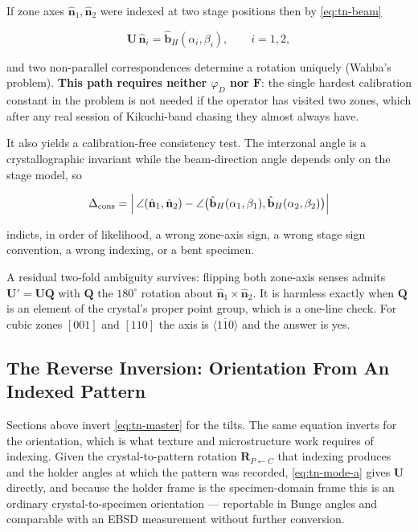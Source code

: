If zone axes $\hat{\mathbf{n}}_1, \hat{\mathbf{n}}_2$ were indexed at two stage positions then by
\eqref{eq:tn-beam}

\begin{equation}
\mathbf{U}\,\hat{\mathbf{n}}_i = \hat{\mathbf{b}}_H(\alpha_i, \beta_i), \qquad i = 1,2,
\label{eq:tn-mode-b}
\end{equation}

and two non-parallel correspondences determine a rotation uniquely (Wahba's problem). \textbf{This
path requires neither $\varphi_D$ nor $\mathbf{F}$}: the single hardest calibration constant in the
problem is not needed if the operator has visited two zones, which after any real session of
Kikuchi-band chasing they almost always have.

It also yields a calibration-free consistency test. The interzonal angle is a crystallographic
invariant while the beam-direction angle depends only on the stage model, so

\begin{equation}
\Delta_{\text{cons}} = \Bigl\lvert\, \angle(\hat{\mathbf{n}}_1,\hat{\mathbf{n}}_2)
- \angle\bigl(\hat{\mathbf{b}}_H(\alpha_1,\beta_1), \hat{\mathbf{b}}_H(\alpha_2,\beta_2)\bigr) \Bigr\rvert
\label{eq:tn-consistency}
\end{equation}

indicts, in order of likelihood, a wrong zone-axis sign, a wrong stage sign convention, a wrong
indexing, or a bent specimen.

A residual two-fold ambiguity survives: flipping both zone-axis senses admits
$\mathbf{U}' = \mathbf{U}\mathbf{Q}$ with $\mathbf{Q}$ the $180^{\circ}$ rotation about
$\hat{\mathbf{n}}_1 \times \hat{\mathbf{n}}_2$. It is harmless exactly when $\mathbf{Q}$ is an
element of the crystal's proper point group, which is a one-line check. For cubic zones $[001]$ and
$[110]$ the axis is $\langle 1\bar{1}0 \rangle$ and the answer is yes.

\subsection{The Reverse Inversion: Orientation From An Indexed Pattern}

Sections above invert \eqref{eq:tn-master} for the tilts. The same equation inverts for the
orientation, which is what texture and microstructure work requires of indexing. Given the
crystal-to-pattern rotation $\mathbf{R}_{P \leftarrow C}$ that indexing produces and the holder
angles at which the pattern was recorded, \eqref{eq:tn-mode-a} gives $\mathbf{U}$ directly, and
because the holder frame is the specimen-domain frame this is an ordinary crystal-to-specimen
orientation --- reportable in Bunge angles and comparable with an EBSD measurement without further
conversion.

